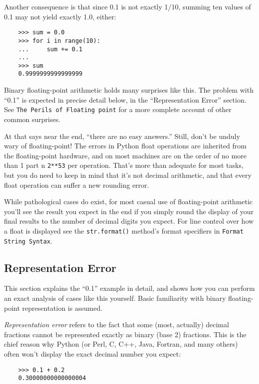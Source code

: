 \documentclass[UTF8]{article}
\begin{document}
Another consequence is that since 0.1 is not exactly 1/10, summing ten values of 0.1 may not yield
exactly 1.0, either:
\begin{verbatim}
    >>> sum = 0.0
    >>> for i in range(10):
    ...     sum += 0.1
    ...
    >>> sum
    0.9999999999999999
\end{verbatim}

Binary floating-point arithmetic holds many surprises like this. The problem with ``0.1'' is
expected in precise detail below, in the ``Representation Error'' section. See \texttt{The Perils
of Floating point} for a more complete account of other common surprises.

At that says near the end, ``there are no easy answers.'' Still, don't be unduly wary of
floating-point! The errors in Python float operations are inherited from the floating-point
hardware, and on most machines are on the order of no more than 1 part n \texttt{2**53} per
operation. That's more than adequate for most tasks, but you do need to keep in mind that it's not
decimal arithmetic, and that every float operation can suffer a new rounding error.

While pathological cases do exist, for most casual use of floating-point arithmetic you'll see the
result you expect in the end if you simply round the display of your final results to the number of
decimal digits you expect. For line control over how a float is displayed see the
\texttt{str.format()} method's format specifiers in \texttt{Format String Syntax}.

\subsection{Representation Error}
This section explains the ``0.1'' example in detail, and shows how you can perform an exact
analysis of cases like this yourself. Basic familiarity with binary floating-point representation
is assumed.

\emph{Representation error} refers to the fact that some (most, actually) decimal fractions cannot
be represented exactly as binary (base 2) fractions. This is the chief reason why Python (or Perl,
C, C++, Java, Fortran, and many others) often won't display the exact decimal number you expect:
\begin{verbatim}
    >>> 0.1 + 0.2
    0.30000000000000004
\end{verbatim}
\end{document}
